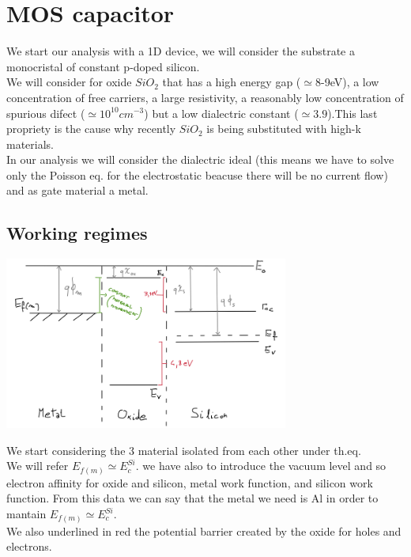 \chapter{MOS capacitor}
We start our analysis with a 1D device, we will consider the substrate a monocristal of constant p-doped silicon.\\
We will consider for oxide $SiO_{2}$ that has a high energy gap ($\simeq$8-9eV), a low concentration of free carriers, a large resistivity, a reasonably low concentration of spurious difect ($\simeq 10^{10}cm^{-3}$) but a low dialectric constant ($\simeq 3.9$).This last propriety is the cause why recently $SiO_2$ is being substituted with high-k materials.\\
In our analysis we will consider the dialectric ideal (this means we have to solve only the Poisson eq. for the electrostatic beacuse there will be no current flow) and as gate material a metal.\\

\section{Working regimes}
\centering
\includegraphics[width=0.7\textwidth]{mos_separate_material.png}\\
\raggedright

We start considering the 3 material isolated from each other under th.eq.\\
We will refer $E_{f(m)}\simeq E_{c}^{Si}$. we have also to introduce the vacuum level and so electron affinity for oxide and silicon, metal work function, and silicon work function. From this data we can say that the metal we need is Al in order to mantain $E_{f(m)}\simeq E_{c}^{Si}$.\\
We also underlined in red the potential barrier created by the oxide for holes and electrons.\\

